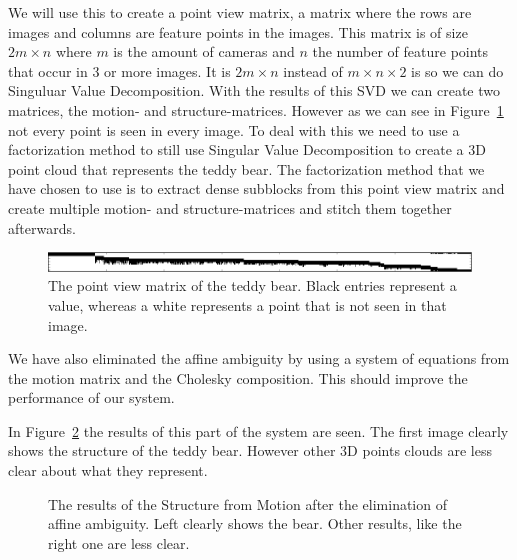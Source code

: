 We will use this to create a point view matrix, a matrix where the rows are images and columns are feature points in the images.
This matrix is of size $2m \times n$ where $m$ is the amount of cameras and $n$ the number of feature points that occur in 3 or more images. 
It is $2m \times n$ instead of $m \times n \times 2$ is so we can do Singuluar Value Decomposition.
With the results of this SVD we can create two matrices, the motion- and structure-matrices.
However as we can see in Figure~\ref{fig:pvm} not every point is seen in every image.
To deal with this we need to use a factorization method to still use Singular Value Decomposition to create a 3D point cloud that represents the teddy bear.
The factorization method that we have chosen to use is to extract dense subblocks from this point view matrix  and create multiple motion- and structure-matrices and stitch them together afterwards.
\begin{figure}[ht]
	\centering
	\includegraphics[width=\textwidth]{pvm}
	\caption{The point view matrix of the teddy bear. Black entries represent a value, whereas a white represents a point that is not seen in that image.}
	\label{fig:pvm}
\end{figure}

We have also eliminated the affine ambiguity by using a system of equations from the motion matrix and the Cholesky composition. This should improve the performance of our system.

In Figure~\ref{fig:points} the results of this part of the system are seen. The first image clearly shows the structure of the teddy bear. However other 3D points clouds are less clear about what they represent.

\begin{figure}[ht]
	 \quad
	\caption{The results of the Structure from Motion after the elimination of affine ambiguity. Left clearly shows the bear. Other results, like the right one are less clear.}
	\label{fig:points}
\end{figure}
